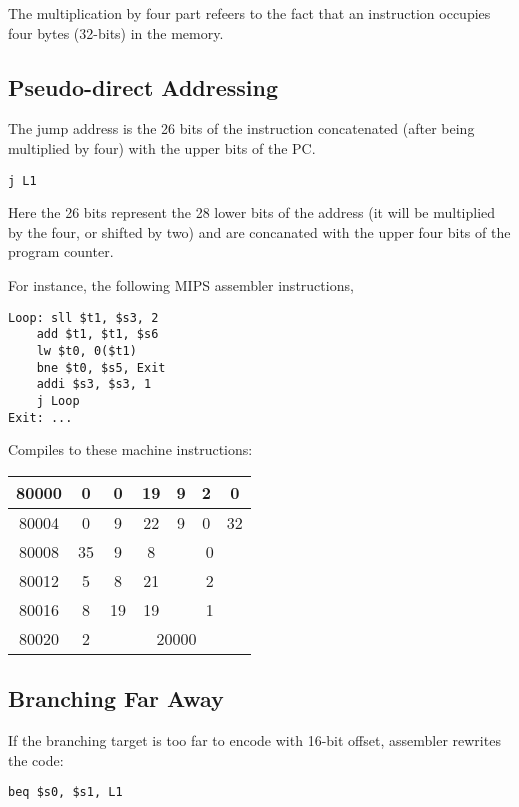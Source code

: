 \documentclass[11pt,a4paper,twocolumn]{book}
\begin{document}
The multiplication by four part refeers to the fact that an instruction occupies four bytes (32-bits) in the memory.\\

\subsection{Pseudo-direct Addressing}

The jump address is the 26 bits of the instruction concatenated (after being multiplied by four) with the upper bits of the PC.

\begin{lstlisting}
j L1
\end{lstlisting}

Here the 26 bits represent the 28 lower bits of the address (it will be multiplied by the four, or shifted by two) and are concanated with the upper four bits of the program counter.

For instance, the following MIPS assembler instructions,

\begin{lstlisting}
Loop: sll $t1, $s3, 2
	add $t1, $t1, $s6
	lw $t0, 0($t1)
	bne $t0, $s5, Exit
	addi $s3, $s3, 1
	j Loop
Exit: ...
\end{lstlisting}

Compiles to these machine instructions:

\begin{table}[ht]
\begin{tabular}{|c|c|c|c|c|c|c|}
\hline
80000 & 0 & 0 & 19 & 9 & 2 & 0\\
\hline
80004 & 0 & 9 & 22 & 9 & 0 & 32\\
\hline
80008 & 35 & 9 & 8 & \multicolumn{3}{c|}{0}\\
\hline
80012 & 5 & 8 & 21 & \multicolumn{3}{c|}{2}\\
\hline
80016 & 8 & 19 & 19 & \multicolumn{3}{c|}{1}\\
\hline
80020 & 2 & \multicolumn{5}{c|}{20000}\\
\hline
\end{tabular}
\end{table}

\subsection{Branching Far Away}

If the branching target is too far to encode with 16-bit offset, assembler rewrites the code:
\begin{lstlisting}
beq $s0, $s1, L1
\end{lstlisting}
\end{document}
